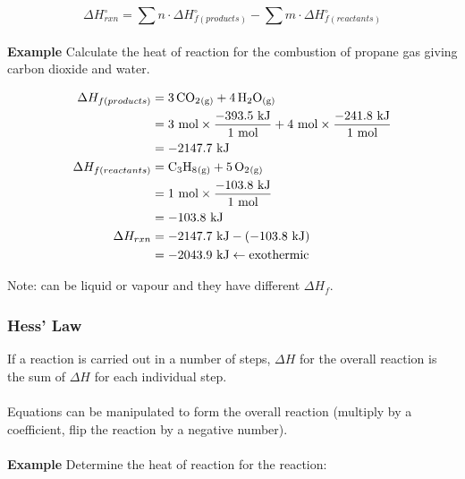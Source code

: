 \documentclass[11pt]{article}
\begin{document}
    \begin{equation*}
        \boxed{\Delta H^\circ_{rxn} = \sum n \cdot \Delta H^\circ_{f (products)} - \sum m \cdot \Delta H^\circ_{f (reactants)} }
    \end{equation*}
    \\
    \textbf{Example} Calculate the heat of reaction for the combustion of propane gas giving carbon dioxide and water.

    \begin{center}
    \end{center}

    \begin{equation*}
        \begin{aligned}
            \Delta H_{f (products)} &= \ce{3 CO2_{(g)} + 4 H2O_{(g)}} \\
                                    &= 3 \text{ mol} \times \frac{-393.5 \text{ kJ}}{1 \text{ mol}} + 4 \text{ mol} \times \frac{-241.8 \text{ kJ}}{1 \text{ mol}} \\
                                    &= -2147.7 \text{ kJ} \\
            \Delta H_{f (reactants)}&= \ce{C3H8_{(g)} + 5 O2_{(g)}} \\
                                    &= 1 \text{ mol} \times \frac{-103.8 \text{ kJ}}{1 \text{ mol}} \\
                                    &= -103.8 \text{ kJ} \\
            \Delta H_{rxn}          &= -2147.7 \text{ kJ} - (-103.8 \text{ kJ}) \\
                                    &= -2043.9 \text{ kJ} \leftarrow \text{exothermic}
        \end{aligned}
    \end{equation*}

    Note:  can be liquid or vapour and they have different $\Delta H_{f}$.

    \newpage
    \subsubsection{Hess' Law}

    If a reaction is carried out in a number of steps, $\Delta H$ for the overall reaction is the sum of $\Delta H$ for each individual step. \\
    \\
    Equations can be manipulated to form the overall reaction (multiply by a coefficient, flip the reaction by a negative number). \\
    \\
    \textbf{Example} Determine the heat of reaction for the reaction:
    \begin{center}
    \end{center}
\end{document}
